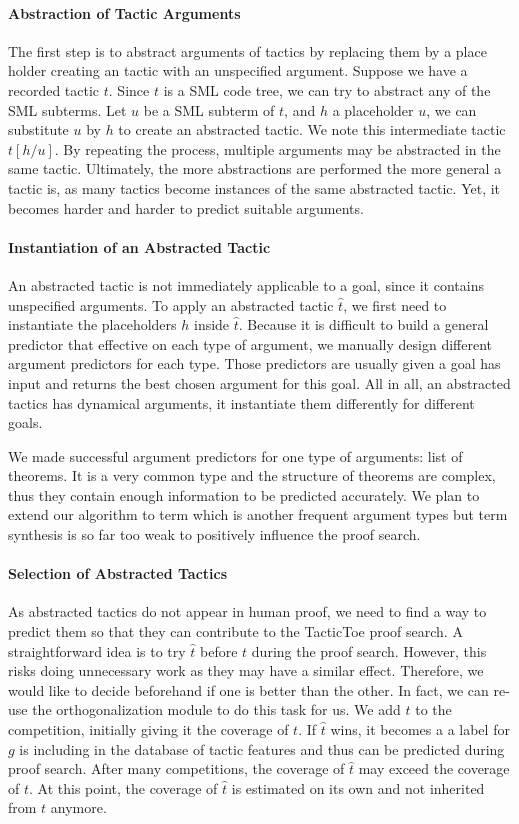 \documentclass[runningheads,a4paper,draft]{svjour3}
\def\sml{\textsf{SML}\xspace}
\def\tactictoe{\textsf{TacticToe}\xspace}
\begin{document}
\paragraph{Abstraction of Tactic Arguments}
The first step is to abstract arguments of tactics by replacing them by a
place holder creating an tactic with an unspecified argument.
Suppose we have a recorded tactic $t$. Since $t$ is a \sml code tree, we can
try to abstract any of the
\sml subterms. Let $u$ be a \sml subterm of $t$, and $h$ a placeholder $u$, we
can substitute $u$ by $h$ to create an abstracted tactic.
We note this intermediate tactic $t[h/u]$. By repeating the
process, multiple
arguments may be abstracted in the same tactic. Ultimately, the more
abstractions are performed the more general a tactic is, as many tactics
become instances of the same abstracted tactic. Yet, it becomes harder and
harder to predict suitable arguments.

\paragraph{Instantiation of an Abstracted Tactic}
An abstracted tactic is not immediately applicable to a goal, since it contains
unspecified arguments. To apply an abstracted tactic $\hat{t}$, we first need
to
instantiate the placeholders $h$ inside $\hat{t}$. Because it is difficult to
build a general predictor that effective on each type of argument, we manually
design different argument predictors for each type. Those predictors are
usually given a goal has input and returns the best chosen argument for this
goal. All in all, an abstracted tactics has
dynamical arguments, it instantiate them differently for different goals.

We made successful argument predictors for one type of arguments: list
of theorems. It is a very common type and the structure of theorems
are complex, thus they contain enough information to be predicted accurately.
We plan to extend our algorithm to term which is another frequent argument
types but term synthesis is so far too weak to positively
influence the proof search.

\paragraph{Selection of Abstracted Tactics}
As abstracted tactics do not appear in human proof, we need to find a way to
predict them so that they can contribute to the \tactictoe proof search.
A straightforward idea is to try $\hat{t}$ before $t$ during the proof search.
However, this risks doing unnecessary work as they may have a similar effect.
Therefore, we would like to decide
beforehand if one is better than the other.
In fact, we can re-use the orthogonalization module to do this task for us.
We add $\hat{t}$ to the competition, initially giving it the coverage of $t$.
If $\hat{t}$
wins, it becomes a a label for $g$ is including in the database of tactic
features and thus can be predicted during proof search.
After many competitions, the coverage of $\hat{t}$ may exceed the coverage of
$t$. At
this point, the coverage of $\hat{t}$ is estimated on its own and not inherited
from
$t$ anymore.
\end{document}

